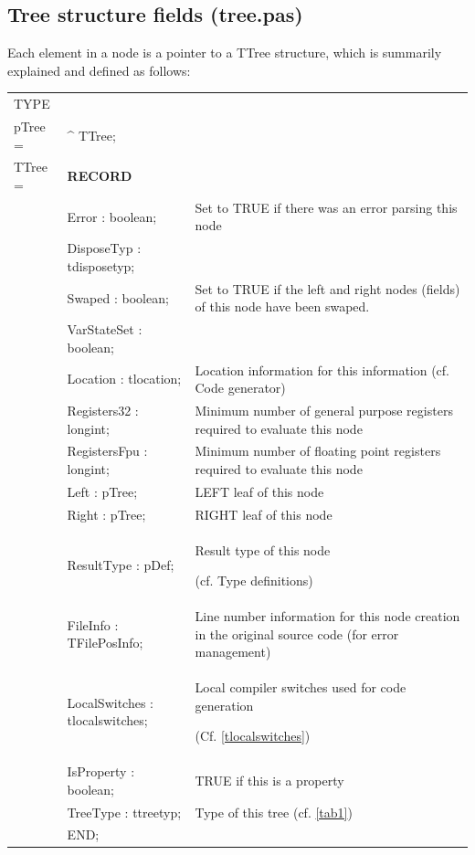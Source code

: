 \documentclass [a4paper,12pt]{article}
\begin{document}
\subsection{Tree structure fields (tree.pas)}
\label{subsec:mylabel2}

Each element in a node is a pointer to a TTree structure, which is summarily
explained and defined as follows:

\begin{tabular*}{6.5in}{|l@{\extracolsep{\fill}}lp{8.0cm}|}
\hline
\textsf{TYPE}& & \\
\xspace pTree = & \^{}  TTree; & \\
\xspace \textsf{TTree} = & \textbf{RECORD}& \\
 & \textsf{Error : boolean;}&  Set to TRUE if there was an error parsing this node\\
 &\textsf{DisposeTyp : tdisposetyp;}&
 \\
 &\textsf{Swaped : boolean;}&
Set to TRUE if the left and right nodes (fields) of this node have been swaped. \\
 & \textsf{VarStateSet : boolean;}&
 \\
 & \textsf{Location : tlocation;}&
Location information for this information (cf. Code generator) \\
 & \textsf{Registers32 : longint;}&
Minimum number of general purpose registers required to evaluate this node \\
 & \textsf{RegistersFpu : longint;}&
Minimum number of floating point registers required to evaluate this node \\
 & \textsf{Left : pTree;}&
LEFT leaf of this node \\
 & \textsf{Right : pTree;}&
RIGHT leaf of this node \\
 & \textsf{ResultType : pDef;}&
Result type of this node  \par (cf. Type definitions) \\
 & \textsf{FileInfo : TFilePosInfo;}&
Line number information for this node creation in the original source code (for error management) \\
 & \textsf{LocalSwitches : tlocalswitches;}&
Local compiler switches used for code generation \par (Cf. \ref{tlocalswitches}) \\
 & \textsf{IsProperty : boolean;}&
TRUE if this is a property \\
 & \textsf{TreeType : ttreetyp;}&
Type of this tree (cf. \ref{tab1}) \\
 & \textsf{END;}&   \\
\hline
\end{tabular*}
\end{document}
